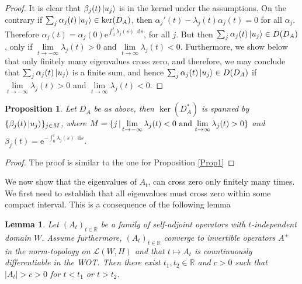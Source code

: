 \documentclass[a4paper,11pt]{article}
\newcommand{\euler}[1]{\text{e}^{#1}}
\newcommand*\diff{\mathop{}\!\mathrm{d}}
\newcommand{\R}{\mathbb{R}}
\newcommand{\pipe}{\hspace{.5mm}|\hspace{.5mm}}
\newtheorem{proposition}{Proposition}
\newtheorem{lemma}{Lemma}
\begin{document}
\begin{proof}
	It is clear that $ \beta_j(t)\ket{u_j} $ is in the kernel under the assumptions. On the contrary if $ \sum_{j}\alpha_j(t)\ket{u_j}\in\ker(D_A) $, then $ \alpha_j'(t)-\lambda_j(t)\alpha_j(t)=0 $ for all $ \alpha_j $. Therefore $ \alpha_j(t)=\alpha_j(0)\euler{\int_{0}^{t}\lambda_j(s)\diff s} $, for all $ j $. But then $ \sum_{j}\alpha_j(t)\ket{u_j}\in D(D_A) $, only if $ \lim\limits_{t\to-\infty}\lambda_j(t)>0 $ and $ \lim\limits_{t\to\infty}\lambda_j(t)<0 $. Furthermore, we show below that only finitely many eigenvalues cross zero, and therefore, we may conclude that $ \sum_{j}\alpha_j(t)\ket{u_j} $ is a finite sum, and hence $ \sum_{j}\alpha_j(t)\ket{u_j}\in D(D_A) $ if $ \lim\limits_{t\to-\infty}\lambda_j(t)>0 $ and $ \lim\limits_{t\to\infty}\lambda_j(t)<0 $.
\end{proof}
\begin{proposition}
	Let $ D_A $ be as above, then $ \ker(D_A^*) $ is spanned by $ \{\beta_j(t)\ket{u_j}\}_{j\in M} $, where $ M=\{j\pipe \text{$ \lim\limits_{t\to-\infty}\lambda_j(t)<0 $ and $ \lim\limits_{t\to\infty}\lambda_j(t)>0 $} \} $ and $ \beta_j(t)=\euler{-\int_{0}^{t}\lambda_j(s)\diff s} $.
\end{proposition}
\begin{proof}
	The proof is similar to the one for Proposition \ref{Prop1}
\end{proof}
We now show that the eigenvalues of $ A_t $, can cross zero only finitely many times. We first need to establish that all eigenvalues must cross zero within some compact interval. This is a consequence of the following lemma 
\begin{lemma}\label{LemmaCrossingsBound}
	Let $ (A_t)_{t\in\R} $ be a family of self-adjoint operators with $ t $-independent domain $ W$. Assume furthermore, $ (A_t)_{t\in\R}$ converge to invertible operators $A^\pm $ in the norm-topology on $ \mathcal{L}(W,H) $ and that $ t\mapsto A_t $ is countinuously differentiable in the WOT. Then there exist $ t_1,t_2\in\R $ and $ c>0 $ such that $ |A_t|>c>0 $ for $ t<t_1 $ or $ t>t_2 $.
\end{lemma}
\end{document}
